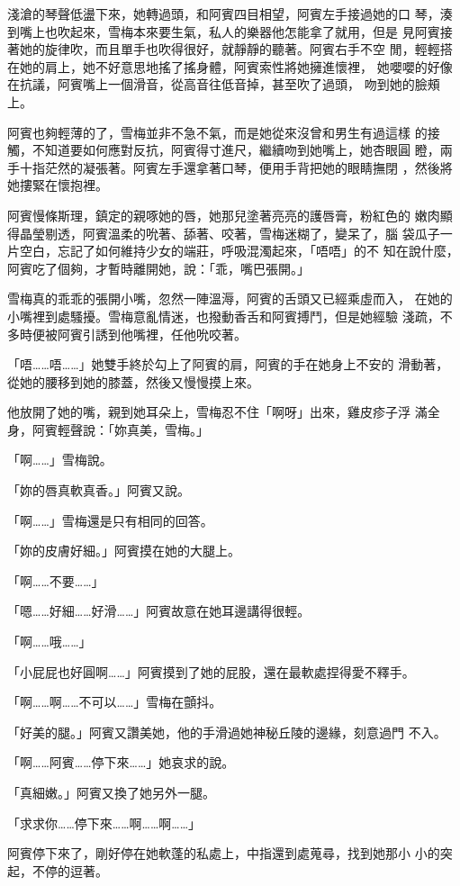 淺滄的琴聲低盪下來，她轉過頭，和阿賓四目相望，阿賓左手接過她的口
琴，湊到嘴上也吹起來，雪梅本來要生氣，私人的樂器他怎能拿了就用，但是
見阿賓接著她的旋律吹，而且單手也吹得很好，就靜靜的聽著。阿賓右手不空
閒，輕輕搭在她的肩上，她不好意思地搖了搖身體，阿賓索性將她擁進懷裡，
她嚶嚶的好像在抗議，阿賓嘴上一個滑音，從高音往低音掉，甚至吹了過頭，
吻到她的臉頰上。

阿賓也夠輕薄的了，雪梅並非不急不氣，而是她從來沒曾和男生有過這樣
的接觸，不知道要如何應對反抗，阿賓得寸進尺，繼續吻到她嘴上，她杏眼圓
瞪，兩手十指茫然的凝張著。阿賓左手還拿著口琴，便用手背把她的眼睛撫閉
，然後將她摟緊在懷抱裡。

阿賓慢條斯理，鎮定的親啄她的唇，她那兒塗著亮亮的護唇膏，粉紅色的
嫩肉顯得晶瑩剔透，阿賓溫柔的吮著、舔著、咬著，雪梅迷糊了，變呆了，腦
袋瓜子一片空白，忘記了如何維持少女的端莊，呼吸混濁起來，「唔唔」的不
知在說什麼，阿賓吃了個夠，才暫時離開她，說：「乖，嘴巴張開。」

雪梅真的乖乖的張開小嘴，忽然一陣溫溽，阿賓的舌頭又已經乘虛而入，
在她的小嘴裡到處騷擾。雪梅意亂情迷，也撥動香舌和阿賓搏鬥，但是她經驗
淺疏，不多時便被阿賓引誘到他嘴裡，任他吮咬著。

「唔……唔……」她雙手終於勾上了阿賓的肩，阿賓的手在她身上不安的
滑動著，從她的腰移到她的膝蓋，然後又慢慢摸上來。

他放開了她的嘴，親到她耳朵上，雪梅忍不住「啊呀」出來，雞皮疹子浮
滿全身，阿賓輕聲說：「妳真美，雪梅。」

「啊……」雪梅說。

「妳的唇真軟真香。」阿賓又說。

「啊……」雪梅還是只有相同的回答。

「妳的皮膚好細。」阿賓摸在她的大腿上。

「啊……不要……」

「嗯……好細……好滑……」阿賓故意在她耳邊講得很輕。

「啊……哦……」

「小屁屁也好圓啊……」阿賓摸到了她的屁股，還在最軟處捏得愛不釋手。

「啊……啊……不可以……」雪梅在顫抖。

「好美的腿。」阿賓又讚美她，他的手滑過她神秘丘陵的邊緣，刻意過門
不入。

「啊……阿賓……停下來……」她哀求的說。

「真細嫩。」阿賓又換了她另外一腿。

「求求你……停下來……啊……啊……」

阿賓停下來了，剛好停在她軟蓬的私處上，中指還到處蒐尋，找到她那小
小的突起，不停的逗著。

